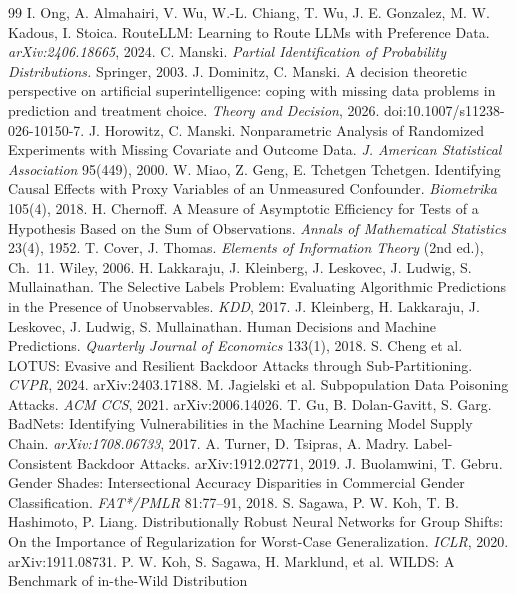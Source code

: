\documentclass[conference]{IEEEtran}
\begin{document}
\begin{thebibliography}{99}
 I. Ong, A. Almahairi, V. Wu, W.-L. Chiang, T. Wu, J. E. Gonzalez, M. W. Kadous, I. Stoica. RouteLLM:
  Learning to Route LLMs with Preference Data. \emph{arXiv:2406.18665}, 2024.
 C. Manski. \emph{Partial Identification of Probability Distributions.} Springer, 2003.
 J. Dominitz, C. Manski. A decision theoretic perspective on artificial superintelligence:
coping with missing data problems in prediction and treatment choice. \emph{Theory and Decision}, 2026.
doi:10.1007/s11238-026-10150-7.
 J. Horowitz, C. Manski. Nonparametric Analysis of Randomized Experiments with Missing Covariate and
  Outcome Data. \emph{J. American Statistical Association} 95(449), 2000.
 W. Miao, Z. Geng, E. Tchetgen Tchetgen. Identifying Causal Effects with Proxy Variables of an Unmeasured
  Confounder. \emph{Biometrika} 105(4), 2018.
 H. Chernoff. A Measure of Asymptotic Efficiency for Tests of a Hypothesis Based on the Sum of
  Observations. \emph{Annals of Mathematical Statistics} 23(4), 1952.
 T. Cover, J. Thomas. \emph{Elements of Information Theory} (2nd ed.), Ch.~11. Wiley, 2006.
 H. Lakkaraju, J. Kleinberg, J. Leskovec, J. Ludwig, S. Mullainathan. The Selective Labels Problem:
  Evaluating Algorithmic Predictions in the Presence of Unobservables. \emph{KDD}, 2017.
 J. Kleinberg, H. Lakkaraju, J. Leskovec, J. Ludwig, S. Mullainathan. Human Decisions and Machine
  Predictions. \emph{Quarterly Journal of Economics} 133(1), 2018.
 S. Cheng et al. LOTUS: Evasive and Resilient Backdoor Attacks through Sub-Partitioning. \emph{CVPR},
  2024. arXiv:2403.17188.
 M. Jagielski et al. Subpopulation Data Poisoning Attacks. \emph{ACM CCS}, 2021. arXiv:2006.14026.
 T. Gu, B. Dolan-Gavitt, S. Garg. BadNets: Identifying Vulnerabilities in the Machine Learning Model
  Supply Chain. \emph{arXiv:1708.06733}, 2017.
 A. Turner, D. Tsipras, A. Madry. Label-Consistent Backdoor Attacks. arXiv:1912.02771, 2019.
 J. Buolamwini, T. Gebru. Gender Shades: Intersectional Accuracy Disparities in
  Commercial Gender Classification. \emph{FAT*/PMLR} 81:77--91, 2018.
 S. Sagawa, P. W. Koh, T. B. Hashimoto, P. Liang. Distributionally Robust Neural Networks
  for Group Shifts: On the Importance of Regularization for Worst-Case Generalization. \emph{ICLR}, 2020.
  arXiv:1911.08731.
 P. W. Koh, S. Sagawa, H. Marklund, et al. WILDS: A Benchmark of in-the-Wild Distribution

\end{thebibliography}
\end{document}
